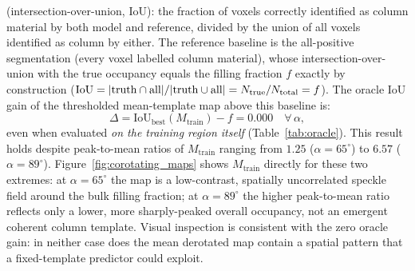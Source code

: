 \documentclass[aip,amsmath,amssymb,reprint]{revtex4-1}
\newcommand{\dang}{\ensuremath{\alpha}}
\begin{document}
(intersection-over-union, IoU): the fraction of voxels correctly identified
as column material by both model and reference, divided by the union
of all voxels identified as column by either.
The reference baseline is the all-positive segmentation (every voxel
labelled column material), whose intersection-over-union with the true
occupancy equals the filling fraction $f$ exactly by construction
($\mathrm{IoU}=|{\rm truth}\cap{\rm all}|/|{\rm truth}\cup{\rm all}|
=N_{\rm true}/N_{\rm total}=f$).
The oracle IoU gain of the thresholded mean-template map above this
baseline is:
\begin{equation}
  \Delta = \mathrm{IoU}_{\mathrm{best}}(M_{\mathrm{train}}) - f = 0.000
  \quad \forall\,\dang,
  \label{eq:oracle_delta}
\end{equation}
even when evaluated \textit{on the training region itself}
(Table~\ref{tab:oracle}).
This result holds despite peak-to-mean ratios of $M_{\mathrm{train}}$
ranging from $1.25$ ($\dang = 65^{\circ}$) to $6.57$ ($\dang = 89^{\circ}$).
Figure~\ref{fig:corotating_maps} shows $M_{\mathrm{train}}$ directly for
these two extremes: at $\dang = 65^{\circ}$ the map is a low-contrast,
spatially uncorrelated speckle field around the bulk filling fraction; at
$\dang = 89^{\circ}$ the higher peak-to-mean ratio reflects only a lower,
more sharply-peaked overall occupancy, not an emergent coherent column
template. Visual inspection is consistent with the zero oracle gain: in
neither case does the mean derotated map contain a spatial pattern that a
fixed-template predictor could exploit.
\end{document}
